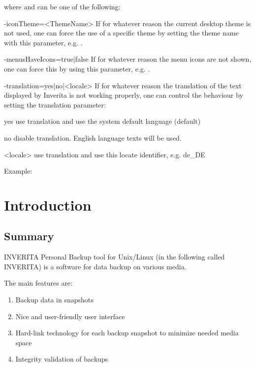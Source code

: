 where  and  can be one of the following:
\begin{attributes}
 \item[-iconTheme=<ThemeName>]
    If for whatever reason the current desktop theme is not used, one can force the
    use of a specific theme by setting the theme name with this parameter, e.g.
    .

  \item[-menusHaveIcons=true|false]
    If for whatever reason the menu icons are not shown, one can force this by using
    this parameter, e.g. .

  \item[-translation=yes|no|<locale>]
    If for whatever reason the translation of the text displayed by Inverita is not
    working properly, one can control the behaviour by setting the translation
    parameter:
    \begin{attributes}[50pt]
       \item[yes]    use translation and use the system default language (default)
       \item[no]     disable translation. English language texts will be used.
       \item[<locale>] use translation and use this locate identifier, e.g. de\_DE
    \end{attributes}
    Example: 
\end{attributes}


\chapter{Introduction}

\section{Summary}
INVERITA Personal Backup tool for Unix/Linux (in the following called INVERITA)
is a software for data backup on various media.

The main features are:
\begin{enumerate}
  \item Backup data in snapshots
  \item Nice and user-friendly user interface
  \item Hard-link technology for each backup snapshot to minimize needed media space
  \item Integrity validation of backups
\end{enumerate}

